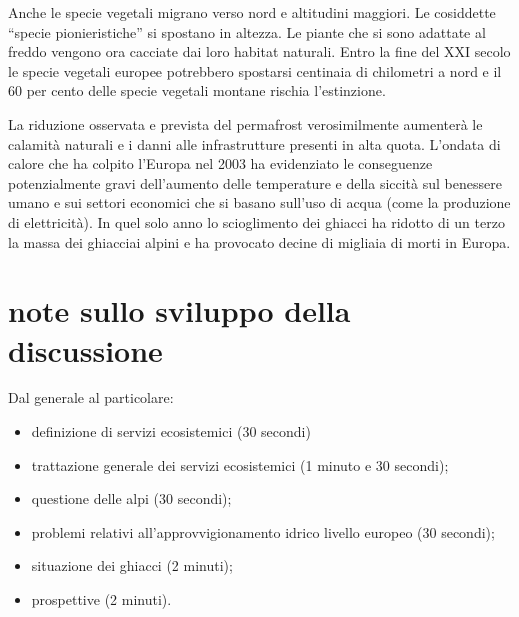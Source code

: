 \documentclass[12pt,a4paper]{article}
\begin{document}
		Anche le specie vegetali migrano verso nord e altitudini maggiori. Le cosiddette ``specie pionieristiche'' si spostano in altezza. Le piante che si sono adattate al freddo vengono ora cacciate dai loro habitat naturali. Entro la fine del XXI secolo le specie vegetali europee potrebbero spostarsi centinaia di chilometri a nord e il 60 per cento delle specie vegetali montane rischia l'estinzione.
		
		La riduzione osservata e prevista del permafrost verosimilmente aumenterà le calamità naturali e i danni alle infrastrutture presenti in alta quota. L'ondata di calore che ha colpito l'Europa nel 2003 ha evidenziato le conseguenze potenzialmente gravi dell'aumento delle temperature e della siccità sul benessere umano e sui settori economici che si basano sull'uso di acqua (come la produzione di elettricità). In quel solo anno lo scioglimento dei ghiacci ha ridotto di un terzo la massa dei ghiacciai alpini e ha provocato decine di migliaia di morti in Europa.
	
	\newpage
	
	
	
	
	\appendix
	\section{note sullo sviluppo della discussione}
	Dal generale al particolare:
	\begin{itemize}
		\item definizione di servizi ecosistemici (30 secondi)
		\item trattazione generale dei servizi ecosistemici (1 minuto e 30 secondi);
		\item questione delle alpi (30 secondi);
		\item problemi relativi all'approvvigionamento idrico livello europeo (30 secondi);
		\item situazione dei ghiacci (2 minuti);
		\item prospettive  (2 minuti).
	\end{itemize}
\end{document}
